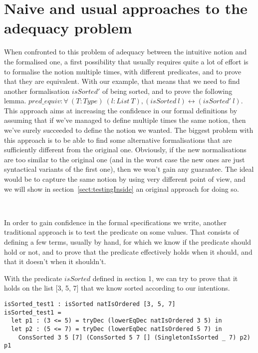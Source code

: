 \section{Naive and usual approaches to the adequacy problem}

\label{sect:naiveApproaches}


When confronted to this problem of adequacy between the intuitive notion and the formalised one, a first possibility that usually requires quite a lot of effort is to formalise the notion multiple times, with different predicates, and to prove that they are equivalent.
With our example, that means that we need to find another formalisation $isSorted'$ of being sorted, and to prove the following lemma.
$pred\_equiv : \forall\ (T:Type)\ (l:List\ T), (isSorted\ l) \leftrightarrow (isSorted'\ l)$.
This approach aims at increasing the confidence in our formal definitions by assuming that if we've managed to define multiple times the same notion, then we've surely succeeded to define the notion we wanted. The biggest problem with this approach is to be able to find some alternative formalisations that are sufficiently different from the original one. Obviously, if the new normalisations are too similar to the original one (and in the worst case the new ones are just syntactical variants of the first one), then we won't gain any guarantee. The ideal would be to capture the same notion by using very different point of view, and we will show in section~\ref{sect:testingInside} an original approach for doing so.

\

In order to gain confidence in the formal specifications we write, another traditional approach is to test the predicate on some values. That consists of defining a few terms, usually by hand, for which we know if the predicate should hold or not, and to prove that the predicate effectively holds when it should, and that it doesn't when it shouldn't.

With the predicate $isSorted$ defined in section 1, we can try to prove that it holds on the list [3, 5, 7] that we know sorted according to our intentions.

\begin{lstlisting}
isSorted_test1 : isSorted natIsOrdered [3, 5, 7]
isSorted_test1 = 
  let p1 : (3 <= 5) = tryDec (lowerEqDec natIsOrdered 3 5) in
  let p2 : (5 <= 7) = tryDec (lowerEqDec natIsOrdered 5 7) in
    ConsSorted 3 5 [7] (ConsSorted 5 7 [] (SingletonIsSorted _ 7) p2) p1
\end{lstlisting}

